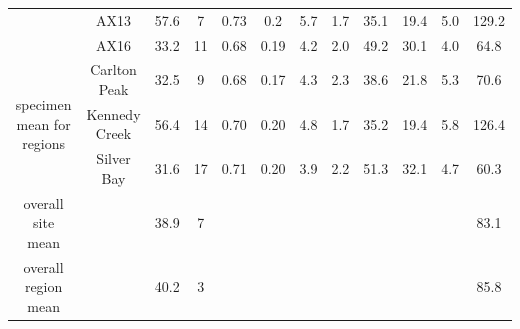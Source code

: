 \documentclass[9pt,twoside,lineno]{pnas-new}
\begin{document}
\begin{table}[]
\begin{tabular}{cccccccccccc}
                                           & AX13          & 57.6      & 7  & 0.73 & 0.2     & 5.7            & 1.7             & 35.1       & 19.4          & 5.0      & 129.2         \\
                                           & AX16          & 33.2      & 11 & 0.68 & 0.19    & 4.2            & 2.0             & 49.2       & 30.1          & 4.0      & 64.8          \\ \hline
\multirow{3}{*}{specimen mean for regions} & Carlton Peak  & 32.5      & 9  & 0.68 & 0.17    & 4.3            & 2.3             & 38.6       & 21.8          & 5.3      & 70.6          \\
                                           & Kennedy Creek & 56.4      & 14 & 0.70 & 0.20    & 4.8            & 1.7             & 35.2       & 19.4          & 5.8      & 126.4         \\
                                           & Silver Bay    & 31.6      & 17 & 0.71 & 0.20    & 3.9            & 2.2             & 51.3       & 32.1          & 4.7      & 60.3          \\ \hline
overall site mean                          &               & 38.9      & 7  &      &         &                &                 &            &               &          & 83.1          \\
overall region mean                        &               & 40.2      & 3  &      &         &                &                 &            &               &          & 85.8         
\end{tabular}
\end{table}



\clearpage


\FloatBarrier


\end{document}
